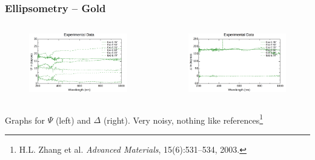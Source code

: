 \documentclass{beamer}
\begin{document}
\begin{frame}
\frametitle{Ellipsometry -- Gold}
\begin{columns}
\begin{figure}
\includegraphics[width=\textwidth]{au_ellipsometry_1}
\end{figure}
\begin{figure}
\includegraphics[width=\textwidth]{au_ellipsometry_2}
\end{figure}
\end{columns}
\begin{center}
Graphs for $\Psi$ (left) and $\Delta$ (right). Very noisy, nothing like references\footnote{H.L. Zhang et al. \emph{Advanced Materials}, 15(6):531--534, 2003.}
\end{center}
\end{frame}
\end{document}
